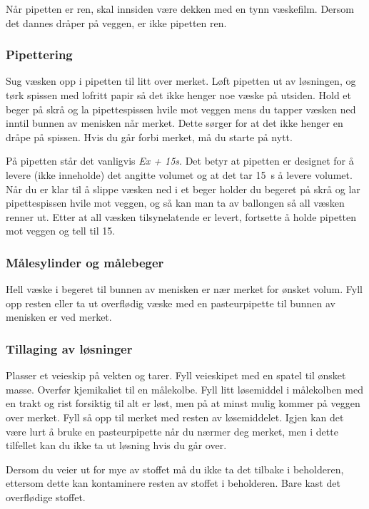 \documentclass[hidelinks,12pt,norsk,a4paper,fleqn]{scrartcl}
\begin{document}
	Når pipetten er ren, skal innsiden være dekken med en tynn væskefilm. Dersom det dannes dråper på veggen, er ikke pipetten ren.
	
	\subsubsection{Pipettering}
	Sug væsken opp i pipetten til litt over merket. Løft pipetten ut av løsningen, og tørk spissen med lofritt papir så det ikke henger noe væske på utsiden. Hold et beger på skrå og la pipettespissen hvile mot veggen mens du tapper væsken ned inntil bunnen av menisken når merket. Dette sørger for at det ikke henger en dråpe på spissen. Hvis du går forbi merket, må du starte på nytt.
	
	På pipetten står det vanligvis \emph{Ex + 15s}. Det betyr at pipetten er designet for å levere (ikke inneholde) det angitte volumet og at det tar \SI{15}{s} å levere volumet. Når du er klar til å slippe væsken ned i et beger holder du begeret på skrå og lar pipettespissen hvile mot veggen, og så kan man ta av ballongen så all væsken renner ut. Etter at all væsken tilsynelatende er levert, fortsette å holde pipetten mot veggen og tell til 15. 
	
	\subsubsection{Målesylinder og målebeger}
	Hell væske i begeret til bunnen av menisken er nær merket for ønsket volum. Fyll opp resten eller ta ut overflødig væske med en pasteurpipette til bunnen av menisken er ved merket.
	
	\subsubsection{Tillaging av løsninger}
	Plasser et veieskip på vekten og tarer. Fyll veieskipet med en spatel til ønsket masse. Overfør kjemikaliet til en målekolbe. Fyll litt løsemiddel i målekolben med en trakt og rist forsiktig til alt er løst, men på at minst mulig kommer på veggen over merket. Fyll så opp til merket med resten av løsemiddelet. Igjen kan det være lurt å bruke en pasteurpipette når du nærmer deg merket, men i dette tilfellet kan du ikke ta ut løsning hvis du går over.
	
	Dersom du veier ut for mye av stoffet må du ikke ta det tilbake i beholderen, ettersom dette kan kontaminere resten av stoffet i beholderen. Bare kast det overflødige stoffet.
	
\end{document}
